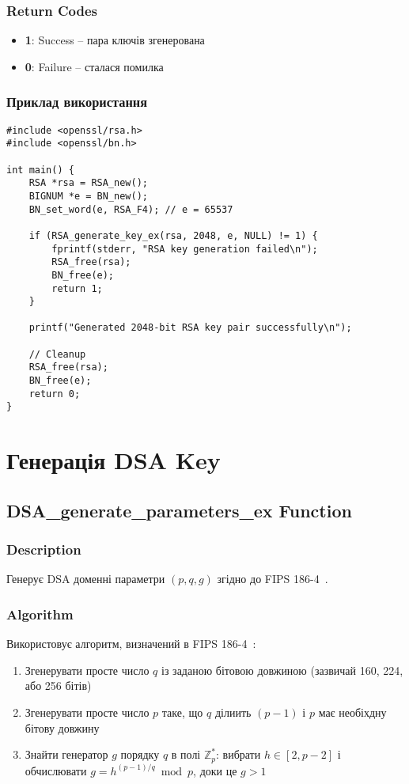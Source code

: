 \subsubsection{Return Codes}
\begin{itemize}
    \item \textbf{1}: Success -- пара ключів згенерована
    \item \textbf{0}: Failure --  сталася помилка
\end{itemize}

\subsubsection{Приклад використання}
\begin{verbatim}
#include <openssl/rsa.h>
#include <openssl/bn.h>

int main() {
    RSA *rsa = RSA_new();
    BIGNUM *e = BN_new();
    BN_set_word(e, RSA_F4); // e = 65537
    
    if (RSA_generate_key_ex(rsa, 2048, e, NULL) != 1) {
        fprintf(stderr, "RSA key generation failed\n");
        RSA_free(rsa);
        BN_free(e);
        return 1;
    }
    
    printf("Generated 2048-bit RSA key pair successfully\n");
    
    // Cleanup
    RSA_free(rsa);
    BN_free(e);
    return 0;
}
\end{verbatim}

\section{Генерація DSA Key}

\subsection{DSA\_generate\_parameters\_ex Function}

\subsubsection{Description}
Генерує DSA доменні параметри $(p, q, g)$ згідно до FIPS 186-4~\cite{fips186}.

\subsubsection{Algorithm}
Використовує алгоритм, визначений в FIPS 186-4~\cite{fips186}:
\begin{enumerate}
    \item Згенерувати просте число $q$ із заданою бітовою довжиною (зазвичай 160, 224, або 256 бітів)
    \item Згенерувати просте число $p$ таке, що $q$ ділиить $(p-1)$ і $p$ має необіхдну бітову довжину
    \item Знайти генератор $g$ порядку $q$ в полі $\mathbb{Z}_p^*$: вибрати $h \in [2, p-2]$ і обчислювати $g = h^{(p-1)/q} \bmod p$, доки це $g > 1$
\end{enumerate}

